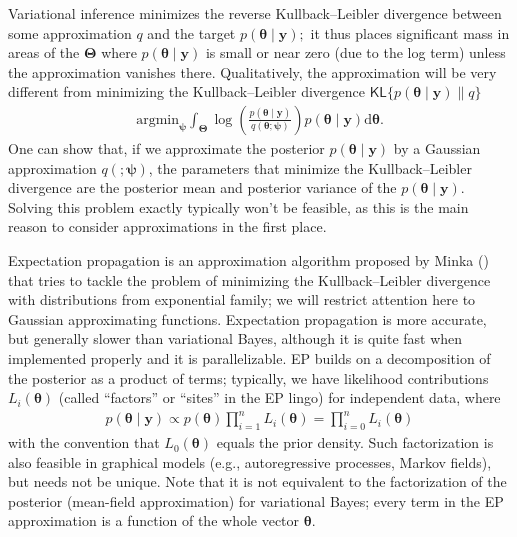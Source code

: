 \documentclass[
  11pt,
  letterpaper,
]{scrbook}
\theoremstyle{definition}
\theoremstyle{plain}
\theoremstyle{plain}
\theoremstyle{plain}
\theoremstyle{definition}
\theoremstyle{definition}
\theoremstyle{plain}
\theoremstyle{plain}
\theoremstyle{remark}
\begin{document}
Variational inference minimizes the reverse Kullback--Leibler divergence
between some approximation \(q\) and the target
\(p(\boldsymbol{\theta} \mid \boldsymbol{y});\) it thus places
significant mass in areas of the \(\boldsymbol{\Theta}\) where
\(p(\boldsymbol{\theta} \mid \boldsymbol{y})\) is small or near zero
(due to the log term) unless the approximation vanishes there.
Qualitatively, the approximation will be very different from minimizing
the Kullback--Leibler divergence
\(\mathsf{KL}\{p(\boldsymbol{\theta} \mid \boldsymbol{y}) \parallel q\}\)
\begin{align*}
 \mathrm{argmin}_{\boldsymbol{\psi}}  \int_{\boldsymbol{\Theta}}\log \left(\frac{p(\boldsymbol{\theta} \mid \boldsymbol{y}) }{q(\boldsymbol{\theta}; \boldsymbol{\psi})}\right) p(\boldsymbol{\theta} \mid \boldsymbol{y}) \mathrm{d} \boldsymbol{\theta}.
\end{align*} One can show that, if we approximate the posterior
\(p(\boldsymbol{\theta} \mid \boldsymbol{y})\) by a Gaussian
approximation \(q(; \boldsymbol{\psi})\), the parameters that minimize
the Kullback--Leibler divergence are the posterior mean and posterior
variance of the \(p(\boldsymbol{\theta} \mid \boldsymbol{y}).\) Solving
this problem exactly typically won't be feasible, as this is the main
reason to consider approximations in the first place.

Expectation propagation is an approximation algorithm proposed by Minka
() that tries to tackle the problem of
minimizing the Kullback--Leibler divergence with distributions from
exponential family; we will restrict attention here to Gaussian
approximating functions. Expectation propagation is more accurate, but
generally slower than variational Bayes, although it is quite fast when
implemented properly and it is parallelizable. EP builds on a
decomposition of the posterior as a product of terms; typically, we have
likelihood contributions \(L_i(\boldsymbol{\theta})\) (called
``factors'' or ``sites'' in the EP lingo) for independent data, where
\begin{align*}
 p(\boldsymbol{\theta} \mid \boldsymbol{y}) \propto p(\boldsymbol{\theta}) \prod_{i=1}^n L_i(\boldsymbol{\theta}) = \prod_{i=0}^n L_i(\boldsymbol{\theta})
\end{align*} with the convention that \(L_0(\boldsymbol{\theta})\)
equals the prior density. Such factorization is also feasible in
graphical models (e.g., autoregressive processes, Markov fields), but
needs not be unique. Note that it is not equivalent to the factorization
of the posterior (mean-field approximation) for variational Bayes; every
term in the EP approximation is a function of the whole vector
\(\boldsymbol{\theta}.\)
\end{document}
